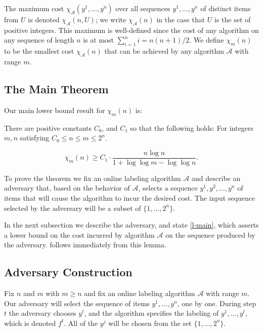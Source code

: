 \documentclass[unicode,review]{siamart1116}
\newcommand{\A}{\mathcal{A}}
\newcommand{\thmA}{{C_0}}
\newcommand{\thmB}{{C_1}}
\numberwithin{theorem}{section}
\begin{document}
 
The maximum cost
$\chi_\A(y^1,\dotsc,y^n)$ over all sequences $y^1,\dotsc,y^n$ of distinct items from $U$  is denoted $\chi_\A(n,U)$;
we write $\chi_\A(n)$ in the case that $U$ is the set of positive integers.
This maximum  is well-defined since the cost of any algorithm on any sequence of length $n$ is at most $\sum_{i=1}^n i = n(n+1)/2$.    
We define $\chi_m(n)$ to be the smallest cost $\chi_\A(n)$ that
can be achieved by any algorithm $\A$ with range $m$.

\subsection{The Main Theorem}
\label{subsec:main theorem}
Our main lower bound result for  $\chi_m(n)$ is:

\begin{theorem}
\label{thm:main}
There are positive constants $\thmA$, and $\thmB$ so that the following holds: For integers $m,n$ satisfying
$\thmA \leq n \le m \le 2^{n}$.


$$\chi_m(n) \geq   \thmB \cdot \frac{n \log n}{1 + \log \log m - \log \log n}.$$

\end{theorem}


To prove the theorem we fix an online labeling algorithm $\A$ and describe an adversary that, based on the 
behavior of $\A$, selects a sequence $y^1,y^2,\dotsc,y^n$ of items that will cause
the algorithm to incur the desired cost.  The input sequence selected by the adversary will be a subset of
$\{1,\ldots,2^n\}$.

 In the next subsection we  describe the adversary,
and state \cref{l-main}, which asserts a lower bound on the cost incurred
by algorithm $\A$ on  the sequence produced by the adversary.  follows
immediately from this lemma.

\subsection{Adversary Construction}
\label{ss-adversary}

 Fix $n$ and $m$ with $m\ge n$  and 
fix an online labeling algorithm $\A$ with range $m$.  Our adversary will select 
the sequence of items $y^1,\dotsc,y^n$, one by one.    During step $t$  the adversary chooses $y^t$,
and the algorithm specifies the labeling of $y^1,\ldots,y^t$, which is denoted $f^t$.  All of the $y^j$ will be chosen
from the set $\{1,\ldots,2^{n}\}$.
\end{document}
